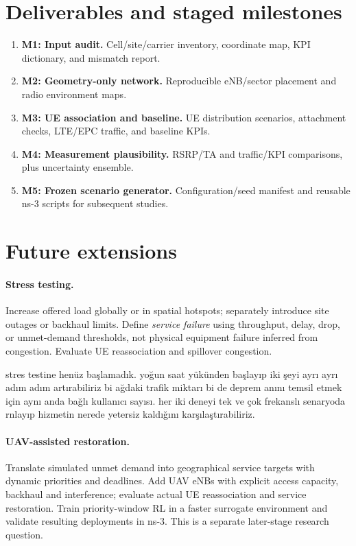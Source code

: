 \documentclass[11pt,a4paper]{article}
\newenvironment{progress}{\par\smallskip\color{blue}}{\par\smallskip}
\begin{document}
\section{Deliverables and staged milestones}
\begin{enumerate}[nosep]
\item \textbf{M1: Input audit.} Cell/site/carrier inventory, coordinate map, KPI dictionary, and mismatch report.
\item \textbf{M2: Geometry-only network.} Reproducible eNB/sector placement and radio environment maps.
\item \textbf{M3: UE association and baseline.} UE distribution scenarios, attachment checks, LTE/EPC traffic, and baseline KPIs.
\item \textbf{M4: Measurement plausibility.} RSRP/TA and traffic/KPI comparisons, plus uncertainty ensemble.
\item \textbf{M5: Frozen scenario generator.} Configuration/seed manifest and reusable ns-3 scripts for subsequent studies.
\end{enumerate}

\section{Future extensions }
\paragraph{Stress testing.} Increase offered load globally or in spatial hotspots; separately introduce site outages or backhaul limits. Define \emph{service failure} using throughput, delay, drop, or unmet-demand thresholds, not physical equipment failure inferred from congestion. Evaluate UE reassociation and spillover congestion.

\begin{progress}
stres testine henüz başlamadık. yoğun saat yükünden başlayıp iki şeyi ayrı ayrı adım adım artırabiliriz bi ağdaki trafik miktarı bi de deprem anını temsil etmek için aynı anda bağlı kullanıcı sayısı. her iki deneyi tek ve çok frekanslı senaryoda rnlayıp hizmetin nerede yetersiz kaldığını karşılaştırabiliriz.
\end{progress}

\paragraph{UAV-assisted restoration.} Translate simulated unmet demand into geographical service targets with dynamic priorities and deadlines. Add UAV eNBs with explicit access capacity, backhaul and interference; evaluate actual UE reassociation and service restoration. Train priority-window RL in a faster surrogate environment and validate resulting deployments in ns-3. This is a separate later-stage research question.
\end{document}
